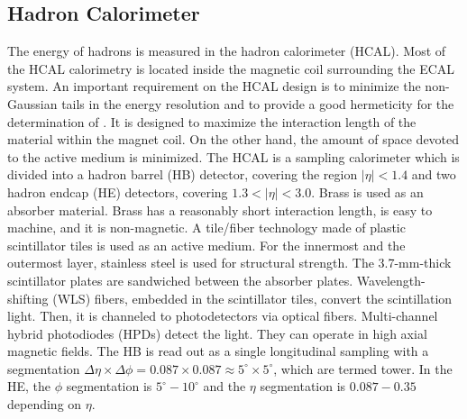 \subsection{Hadron Calorimeter}
The energy of hadrons is measured in the hadron calorimeter (HCAL). Most of the HCAL calorimetry is located inside the magnetic coil surrounding the ECAL system. An important requirement on the HCAL design is to minimize the non-Gaussian tails in the energy resolution and to provide a good hermeticity for the determination of \met. It is designed to maximize the interaction length of the material within the magnet coil. On the other hand, the amount of space devoted to the active medium is minimized. The HCAL is a sampling calorimeter which is divided into a hadron barrel (HB) detector, covering the region $|\eta| < 1.4$ and two hadron endcap (HE) detectors, covering $1.3 < |\eta| < 3.0$. Brass is used as an absorber material. Brass has a reasonably short interaction length, is easy to machine, and it is non-magnetic. A tile/fiber technology made of plastic scintillator tiles is used as an active medium. For the innermost and the outermost layer, stainless steel is used for structural strength. The 3.7-mm-thick scintillator plates are sandwiched between the absorber plates. Wavelength-shifting (WLS) fibers, embedded in the scintillator tiles, convert the scintillation light. Then, it is channeled to photodetectors via optical fibers. Multi-channel hybrid photodiodes (HPDs) detect the light. They can operate in high axial magnetic fields. The HB is read out as a single longitudinal sampling with a segmentation $\Delta \eta \times \Delta \phi=0.087 \times 0.087 \approx 5^{\circ} \times 5^{\circ}$, which are termed tower. In the HE, the $\phi$ segmentation is $5^{\circ} - 10^{\circ}$ and the $\eta$ segmentation is $0.087 - 0.35$ depending on $\eta$.

